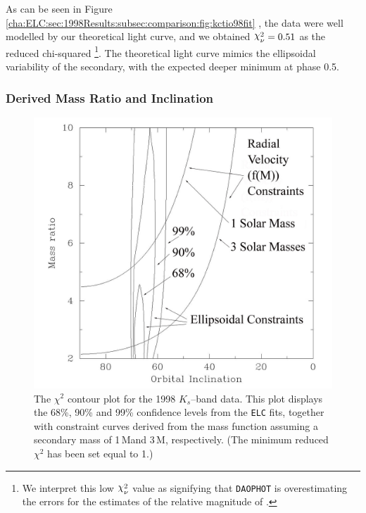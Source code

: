 As can be seen in Figure~%
\vref{cha:ELC:sec:1998Results:subsec:comparison:fig:kctio98fit}%
, the data were well modelled by our theoretical light curve, and we
obtained $\Chi_{\nu}^{2} = 0.51$ as the reduced chi-squared%
\footnote{\label{cha:ELC:sec:1998Results:foot:LowError}
We interpret this low $\Chi_{\nu}^{2}$ value as signifying that
\texttt{DAOPHOT} is overestimating the errors for the estimates of the
relative magnitude of \groj. }. %
The theoretical light curve mimics the ellipsoidal variability of the
secondary, with the expected deeper minimum at phase 0.5. %


\subsubsection{Derived Mass Ratio and Inclination}\label{cha:ELC:sec:1998Results:subsec:comparison:subsubsec:derivedQ}

\begin{figure}[!htb]
\begin{center}
\includegraphics[width=5.0in]{contourPlot2}
\caption{%
The $\chi^2$ contour plot for the 1998 $K_{s}$--band data. This plot displays the 68\%, 90\% and
 99\% confidence levels from the \texttt{ELC} fits, together with constraint curves derived from the mass function assuming a secondary mass of 1\,M\sun and 3\,M\sun, respectively. (The minimum reduced $\chi^2$ has been set equal to 1.) %
}\label{cha:ELC:sec:1995Results:subsec:comparison:fig:contourPlot2}
\end{center}
\end{figure}

